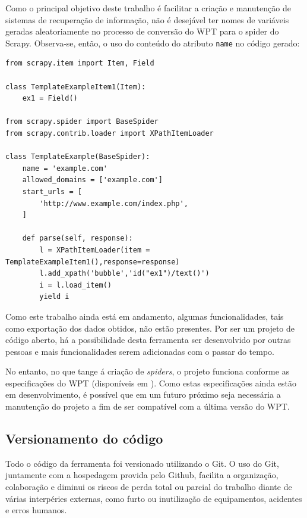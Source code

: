 Como o principal objetivo deste trabalho é facilitar a criação e manutenção de sistemas de recuperação de informação, não é desejável ter nomes de variáveis geradas aleatoriamente no processo de conversão do WPT para o spider do Scrapy. Observa-se, então, o uso do conteúdo do atributo \texttt{name} no código gerado:

\begin{lstlisting}
from scrapy.item import Item, Field

class TemplateExampleItem1(Item):
    ex1 = Field()

from scrapy.spider import BaseSpider
from scrapy.contrib.loader import XPathItemLoader

class TemplateExample(BaseSpider):
    name = 'example.com'
    allowed_domains = ['example.com']
    start_urls = [
        'http://www.example.com/index.php',
    ]

    def parse(self, response):
        l = XPathItemLoader(item = TemplateExampleItem1(),response=response)
        l.add_xpath('bubble','id("ex1")/text()') 
        i = l.load_item()
        yield i

\end{lstlisting}


Como este trabalho ainda está em andamento, algumas funcionalidades, tais como exportação dos dados obtidos, não estão presentes. Por ser um projeto de código aberto, há a possibilidade desta ferramenta ser desenvolvido por outras pessoas e mais funcionalidades serem adicionadas com o passar do tempo.

No entanto, no que tange á criação de \emph{spiders}, o projeto funciona conforme as especificações do WPT (disponíveis em \cite{wpt}). Como estas especificações ainda estão em desenvolvimento, é possível que em um futuro próximo seja necessária a manutenção do projeto a fim de ser compatível com a última versão do WPT.

\subsection{Versionamento do código}

Todo o código da ferramenta foi versionado utilizando o Git. O uso do Git, juntamente com a hospedagem provida pelo Github, facilita a organização, colaboração e diminui os riscos de perda total ou parcial do trabalho diante de várias interpéries externas, como furto ou inutilização de equipamentos, acidentes e erros humanos.

